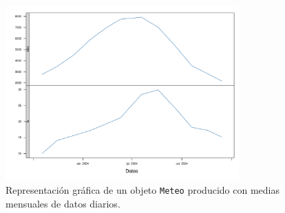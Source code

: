 \begin{figure}[!htb]
\centering
\includegraphics[width=0.8\textwidth]{figuras/codigo-readg0dm.pdf}
\caption{Representación gráfica de un objeto \texttt{Meteo} producido con medias mensuales de datos diarios.}
\end{figure}
\FloatBarrier
